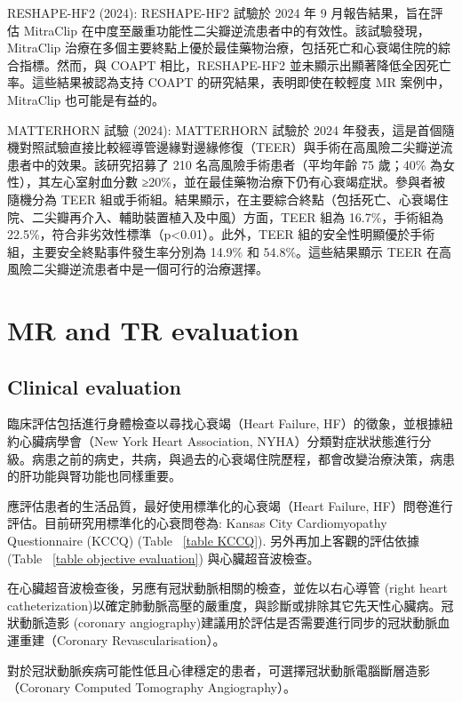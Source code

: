 \documentclass[nols]{tufte-book}
\begin{document}
RESHAPE-HF2 (2024): RESHAPE-HF2 試驗於 2024 年 9 月報告結果，旨在評估 MitraClip 在中度至嚴重功能性二尖瓣逆流患者中的有效性。該試驗發現，MitraClip 治療在多個主要終點上優於最佳藥物治療，包括死亡和心衰竭住院的綜合指標。然而，與 COAPT 相比，RESHAPE-HF2 並未顯示出顯著降低全因死亡率。這些結果被認為支持 COAPT 的研究結果，表明即使在較輕度 MR 案例中，MitraClip 也可能是有益的。\cite{Anker2024}

MATTERHORN 試驗 (2024): MATTERHORN 試驗於 2024 年發表，這是首個隨機對照試驗直接比較經導管邊緣對邊緣修復（TEER）與手術在高風險二尖瓣逆流患者中的效果。該研究招募了 210 名高風險手術患者（平均年齡 75 歲；40\% 為女性），其左心室射血分數 ≥20\%，並在最佳藥物治療下仍有心衰竭症狀。參與者被隨機分為 TEER 組或手術組。結果顯示，在主要綜合終點（包括死亡、心衰竭住院、二尖瓣再介入、輔助裝置植入及中風）方面，TEER 組為 16.7\%，手術組為 22.5\%，符合非劣效性標準（p<0.01）。此外，TEER 組的安全性明顯優於手術組，主要安全終點事件發生率分別為 14.9\% 和 54.8\%。這些結果顯示 TEER 在高風險二尖瓣逆流患者中是一個可行的治療選擇。\cite{Baldus2024}

\section{MR and TR evaluation}



\subsection{Clinical evaluation}

臨床評估包括進行身體檢查以尋找心衰竭（Heart Failure, HF）的徵象，並根據紐約心臟病學會（New York Heart Association, NYHA）分類對症狀狀態進行分級。病患之前的病史，共病，與過去的心衰竭住院歷程，都會改變治療決策，病患的肝功能與腎功能也同樣重要。\cite{Tachibana2023}

應評估患者的生活品質，最好使用標準化的心衰竭（Heart Failure, HF）問卷進行評估。目前研究用標準化的心衰問卷為: Kansas City Cardiomyopathy Questionnaire (KCCQ) (Table ~\ref{table KCCQ}). 另外再加上客觀的評估依據 (Table ~\ref{table objective evaluation}) 與心臟超音波檢查。

在心臟超音波檢查後，另應有冠狀動脈相關的檢查，並佐以右心導管 (right heart catheterization)以確定肺動脈高壓的嚴重度，與診斷或排除其它先天性心臟病。冠狀動脈造影 (coronary angiography)建議用於評估是否需要進行同步的冠狀動脈血運重建（Coronary Revascularisation）。\cite{Sanchis2023, Grayburn2021}

對於冠狀動脈疾病可能性低且心律穩定的患者，可選擇冠狀動脈電腦斷層造影（Coronary Computed Tomography Angiography）。
\end{document}
